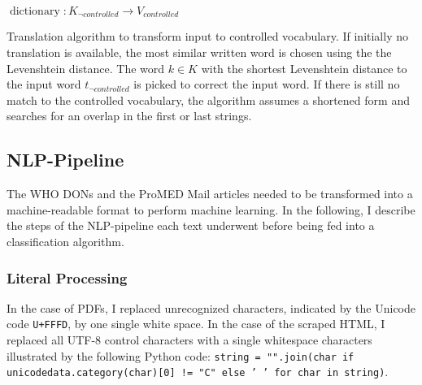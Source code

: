 \begin{algorithm}[h]
  \SetAlgoLined
    $\operatorname{dictionary}: K_{\neg controlled} \to V_{controlled}$\;
\caption{Translation algorithm to transform input to controlled vocabulary. If initially no translation is available, the most similar written word is chosen using the the Levenshtein distance. The word $k \in K$ with the shortest Levenshtein distance to the input word $t_{\neg controlled}$ is picked to correct the input word. If there is still no match to the controlled vocabulary, the algorithm assumes a shortened form and searches for an overlap in the first or last strings.}
\label{lst:translate}
\end{algorithm}

\subsection{NLP-Pipeline}
The WHO DONs and the ProMED Mail articles needed to be transformed into a machine-readable format to perform machine learning. In the following, I describe the steps of the NLP-pipeline each text underwent before being fed into a classification algorithm.

\subsubsection{Literal Processing}
In the case of PDFs, I replaced unrecognized characters, indicated by the Unicode code \texttt{U+FFFD}, by one single white space. In the case of the scraped HTML, I replaced all UTF-8 control characters with a single whitespace characters illustrated by the following Python code: \texttt{string = "".join(char if unicodedata.category(char)[0] != "C" else ' ' for char in string)}.

